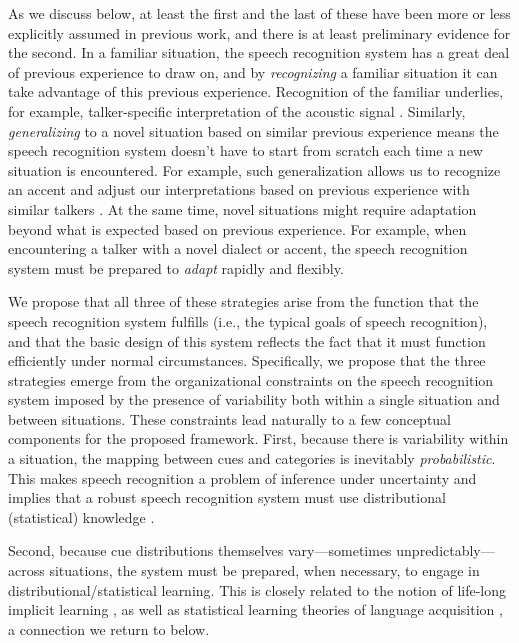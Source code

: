 \label{r1-formalize-prev-work}
As we discuss below, at least the first and the last of these have been more or less explicitly assumed in previous work, and there is at least preliminary evidence for the second.  In a familiar situation, the speech recognition system has a great deal of previous experience to draw on, and by \emph{recognizing} a familiar situation it can take advantage of this previous experience. Recognition of the familiar underlies, for example, talker-specific interpretation of the acoustic signal \cite{Creel2008,Eisner2005,Goldinger1998,Kraljic2007,Nygaard1998}. Similarly, {\em generalizing} to a novel situation based on similar previous experience means the speech recognition system doesn't have to start from scratch each time a new situation is encountered. For example, such generalization allows us to recognize an accent and adjust our interpretations based on previous experience with similar talkers \cite{Baese-berk2013,Bradlow2008,Sidaras2009}. At the same time, novel situations might require adaptation beyond what is expected based on previous experience. For example, when encountering a talker with a novel dialect or accent, the speech recognition system must be prepared to \emph{adapt} rapidly and flexibly.

We propose that all three of these strategies arise from the function that the speech recognition system fulfills (i.e., the typical goals of speech recognition), and that the basic design of this system reflects the fact that it must function efficiently under normal
circumstances. Specifically, we propose that the three strategies emerge from the organizational constraints on the speech recognition system imposed by the presence of variability both within a single situation and between situations.  These constraints lead naturally to a few conceptual components for the proposed framework.  First, because there is variability within a situation, the mapping between cues and categories is inevitably \emph{probabilistic}. This makes speech recognition a problem of inference under uncertainty and implies that a robust speech recognition system must use distributional (statistical) knowledge \cite{Clayards2008,Feldman2009a,Norris2008}.

Second, because cue distributions themselves vary---sometimes unpredictably---across situations, the system must be prepared, when necessary, to engage in distributional/statistical learning.  This is closely related to the notion of life-long implicit learning \cite{Botvinick2004,Elman1990,Chang2006}, as well as statistical learning theories of language acquisition \cite{Feldman2013a,McMurray2009,Vallabha2007}, a connection we return to below.

